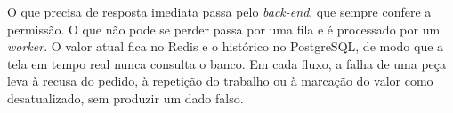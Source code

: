 \par O que precisa de resposta imediata passa pelo \emph{back-end}, que sempre confere a permissão. O que não pode se perder passa por uma fila e é processado por um \emph{worker}. O valor atual fica no Redis e o histórico no PostgreSQL, de modo que a tela em tempo real nunca consulta o banco. Em cada fluxo, a falha de uma peça leva à recusa do pedido, à repetição do trabalho ou à marcação do valor como desatualizado, sem produzir um dado falso.
